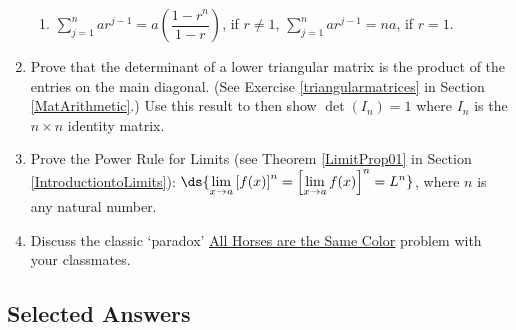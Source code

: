 \documentclass{ximera}
\begin{document}
\begin{enumerate}
\begin{enumerate}
\item  \label{proofgeosumex} $\displaystyle{\sum_{j=1}^{n} a r^{j-1} = a \left( \dfrac{1-r^n}{1-r}\right)}$, if $r \neq 1$, $\displaystyle{\sum_{j=1}^{n} a r^{j-1} = na}$, if $r=1$.

\end{enumerate}

\item  Prove that the determinant of a lower triangular matrix is the product of the entries on the main diagonal.  (See Exercise \ref{triangularmatrices} in Section \ref{MatArithmetic}.)  Use this result to then show $\det\left(I_{n}\right) = 1$ where $I_{n}$ is the $n \times n$ identity matrix.

\item  \label{limitpowerruleproof} Prove the Power Rule for Limits (see Theorem \ref{LimitProp01} in Section \ref{IntroductiontoLimits}): $\ds{\lim_{x \rightarrow a} \left[f(x)\right]^{n} = \left[\lim_{x \rightarrow a} f(x) \right]^{n}= L^{n}}$, where $n$ is any natural number.

\item  Discuss the classic  `paradox' \href{http://en.wikipedia.org/wiki/All_horses_are_the_same_color}{\underline{All Horses are the Same Color}} problem with your classmates.

\end{enumerate}

\newpage

\subsection{Selected Answers}
\end{document}
